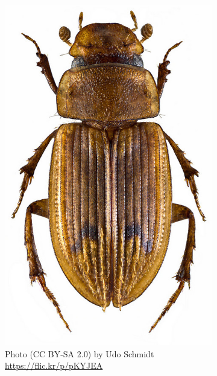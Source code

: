 \documentclass[letterpaper, 11pt]{article}
\begin{document}
\begin{figure}[ht!]
\begin{subfigure}[ht!]{0.25\textwidth}
    \includegraphics[width=\textwidth]{ScarabHabitus2}
  \caption{Photo (CC BY-SA 2.0) by Udo Schmidt \url{https://flic.kr/p/pKYJEA}}
  \label{fig:scarabaeid2}
\end{subfigure}
    ~
\begin{subfigure}[ht!]{0.23\textwidth}

\end{subfigure}
\end{figure}
\end{document}
